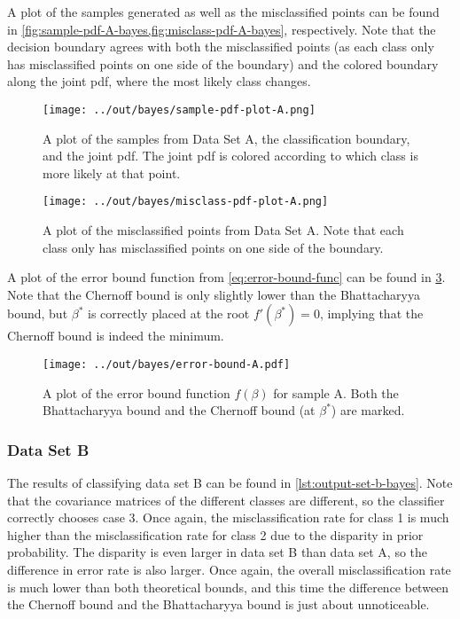 \documentclass[headings=optiontoheadandtoc,listof=totoc,parskip=full]{scrartcl}
\begin{document}


A plot of the samples generated as well as the misclassified points can be found in \cref{fig:sample-pdf-A-bayes,fig:misclass-pdf-A-bayes}, respectively. Note that the decision boundary agrees with both the misclassified points (as each class only has misclassified points on one side of the boundary) and the colored boundary along the joint pdf, where the most likely class changes.

\begin{figure}[H]
	\centering
	\texttt{[image: ../out/bayes/sample-pdf-plot-A.png]}
	\caption{A plot of the samples from Data Set A, the classification boundary, and the joint pdf. The joint pdf is colored according to which class is more likely at that point.}
	\label{fig:sample-pdf-A-bayes}
\end{figure}


\begin{figure}[H]
	\centering
	\texttt{[image: ../out/bayes/misclass-pdf-plot-A.png]}
	\caption{A plot of the misclassified points from Data Set A. Note that each class only has misclassified points on one side of the boundary.}
	\label{fig:misclass-pdf-A-bayes}
\end{figure}

A plot of the error bound function from \cref{eq:error-bound-func} can be found in \cref{fig:error-bound-A}. Note that the Chernoff bound is only slightly lower than the Bhattacharyya bound, but $\beta^*$ is correctly placed at the root $f'(\beta^*) = 0$, implying that the Chernoff bound is indeed the minimum.

\begin{figure}[H]
	\centering
	\texttt{[image: ../out/bayes/error-bound-A.pdf]}
	\caption{A plot of the error bound function $f(\beta)$ for sample A. Both the Bhattacharyya bound and the Chernoff bound (at $\beta^*$) are marked.}
	\label{fig:error-bound-A}
\end{figure}

\subsubsection{Data Set B}

The results of classifying data set B can be found in \cref{lst:output-set-b-bayes}. Note that the covariance matrices of the different classes are different, so the classifier correctly chooses case 3. Once again, the misclassification rate for class 1 is much higher than the misclassification rate for class 2 due to the disparity in prior probability. The disparity is even larger in data set B than data set A, so the difference in error rate is also larger. Once again, the overall misclassification rate is much lower than both theoretical bounds, and this time the difference between the Chernoff bound and the Bhattacharyya bound is just about unnoticeable.
\end{document}

